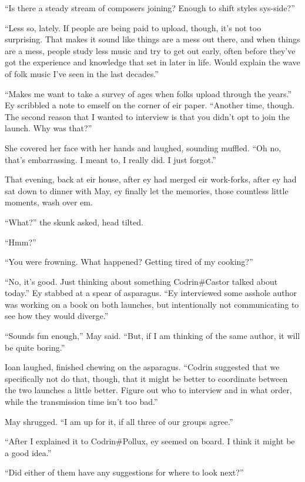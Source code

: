 ``Is there a steady stream of composers joining? Enough to shift styles sys-side?''

``Less so, lately. If people are being paid to upload, though, it's not too surprising. That makes it sound like things are a mess out there, and when things are a mess, people study less music and try to get out early, often before they've got the experience and knowledge that set in later in life. Would explain the wave of folk music I've seen in the last decades.''

``Makes me want to take a survey of ages when folks upload through the years.'' Ey scribbled a note to emself on the corner of eir paper. ``Another time, though. The second reason that I wanted to interview is that you didn't opt to join the launch. Why was that?''

She covered her face with her hands and laughed, sounding muffled. ``Oh no, that's embarrassing. I meant to, I really did. I just forgot.''

That evening, back at eir house, after ey had merged eir work-forks, after ey had sat down to dinner with May, ey finally let the memories, those countless little moments, wash over em.

``What?'' the skunk asked, head tilted.

``Hmm?''

``You were frowning. What happened? Getting tired of my cooking?''

``No, it's good. Just thinking about something Codrin\#Castor talked about today.'' Ey stabbed at a spear of asparagus. ``Ey interviewed some asshole author was working on a book on both launches, but intentionally not communicating to see how they would diverge.''

``Sounds fun enough,'' May said. ``But, if I am thinking of the same author, it will be quite boring.''

Ioan laughed, finished chewing on the asparagus. ``Codrin suggested that we specifically not do that, though, that it might be better to coordinate between the two launches a little better. Figure out who to interview and in what order, while the transmission time isn't too bad.''

May shrugged. ``I am up for it, if all three of our groups agree.''

``After I explained it to Codrin\#Pollux, ey seemed on board. I think it might be a good idea.''

``Did either of them have any suggestions for where to look next?''

